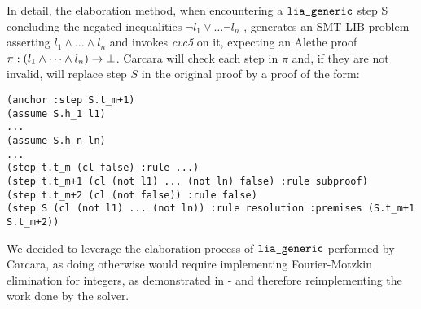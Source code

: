 In detail, the elaboration method, when encountering a $\tt{lia\_generic}$ step S concluding the negated inequalities $ \neg l_1 \lor \dots \neg l_n$ , generates an SMT-LIB problem asserting $l_1 \land \dots \land l_n$ and invokes \emph{cvc5} on it, expecting an Alethe proof $\pi : (l_1 \land \dots \land l_n) \ra \bot$.
Carcara will check each step in $\pi$ and, if they are not invalid, will replace step $S$ in the original proof by a proof of the form:
\begin{lstlisting}[language=SMT,caption={Elaboration of $\tt{lia\_generic}$},label={lst:elab_lia}]
(anchor :step S.t_m+1)
(assume S.h_1 l1)
...
(assume S.h_n ln)
...
(step t.t_m (cl false) :rule ...)
(step t.t_m+1 (cl (not l1) ... (not ln) false) :rule subproof)
(step t.t_m+2 (cl (not false)) :rule false)
(step S (cl (not l1) ... (not ln)) :rule resolution :premises (S.t_m+1 S.t_m+2))
\end{lstlisting}

We decided to leverage the elaboration process of $\tt{lia\_generic}$ performed by Carcara,
as doing otherwise would require implementing Fourier-Motzkin elimination for integers, as demonstrated in \cite{omegatest,micromega} -
and therefore reimplementing the work done by the solver.